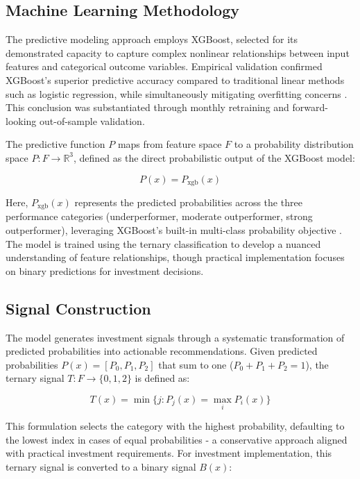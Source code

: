 \subsection{Machine Learning Methodology}

The predictive modeling approach employs XGBoost, selected for its demonstrated capacity to capture complex nonlinear relationships between input features and categorical outcome variables. Empirical validation confirmed XGBoost's superior predictive accuracy compared to traditional linear methods such as logistic regression, while simultaneously mitigating overfitting concerns \parencite{Yang2024ComparisonClassification}. This conclusion was substantiated through monthly retraining and forward-looking out-of-sample validation.

The predictive function $P$ maps from feature space $F$ to a probability distribution space $P: F \rightarrow \mathbb{R}^3$, defined as the direct probabilistic output of the XGBoost model:

\begin{equation}
P(x) = P_{\text{xgb}}(x)
\end{equation}

Here, $P_{\text{xgb}}(x)$ represents the predicted probabilities across the three performance categories (underperformer, moderate outperformer, strong outperformer), leveraging XGBoost's built-in multi-class probability objective \parencite{Guillaume2023HowClassification}. The model is trained using the ternary classification to develop a nuanced understanding of feature relationships, though practical implementation focuses on binary predictions for investment decisions.

\subsection{Signal Construction}

The model generates investment signals through a systematic transformation of predicted probabilities into actionable recommendations. Given predicted probabilities $P(x) = [P_0, P_1, P_2]$ that sum to one ($P_0 + P_1 + P_2 = 1$), the ternary signal $T: F \rightarrow \{0,1,2\}$ is defined as:

\begin{equation}
T(x) = \min \{ j : P_j(x) = \max_i P_i(x) \}
\end{equation}

This formulation selects the category with the highest probability, defaulting to the lowest index in cases of equal probabilities - a conservative approach aligned with practical investment requirements. For investment implementation, this ternary signal is converted to a binary signal $B(x)$:

